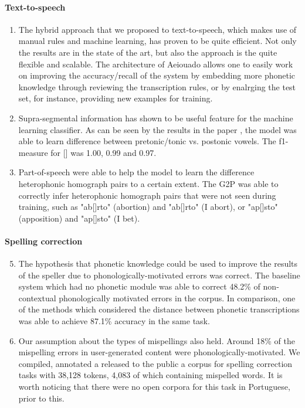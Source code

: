 \paragraph*{Text-to-speech}
  \begin{enumerate}
    \item The hybrid approach that we proposed to text-to-speech, which makes use of manual rules and machine learning, has proven to be quite efficient. Not only the results are in the state of the art, but also the approach is the quite flexible and scalable. The architecture of Aeiouado allows one to easily work on improving the accuracy/recall of the system by embedding more phonetic knowledge through reviewing the transcription rules, or by enalrging the test set, for instance, providing new examples for training.
    \item Supra-segmental information has shown to be useful feature for the machine learning classifier. As can be seen by the results in the paper \cite{Mendonca2014}, the model was able to learn difference between pretonic/tonic vs. postonic vowels. The f1-measure for [] was 1.00, 0.99 and 0.97. 
    \item Part-of-speech were able to help the model to learn the difference heterophonic homograph pairs to a certain extent. The G2P was able to correctly infer heterophonic homograph pairs that were not seen during training, such as "ab[]rto" (abortion) and "ab[]rto" (I abort), or "ap[]sto" (apposition) and "ap[]sto" (I bet).
  \end{enumerate}

\paragraph*{Spelling correction}
  \begin{enumerate}
    \setcounter{enumi}{4}
    \item The hypothesis that phonetic knowledge could be used to improve the results of the speller due to phonologically-motivated errors was correct. The baseline system which had no phonetic module was able to correct 48.2\% of non-contextual phonologically motivated errors in the corpus. In comparison, one of the methods which considered the distance between phonetic transcriptions was  able to achieve 87.1\% accuracy in the same task.
    \item Our assumption about the types of mispellings also held. Around 18\% of the mispelling errors in user-generated content were phonologically-motivated. We compiled, annotated a released to the public a corpus for spelling correction tasks with 38,128 tokens, 4,083 of which containing mispelled words. It is worth noticing that there were no open corpora for this task in Portuguese, prior to this.
  \end{enumerate}

